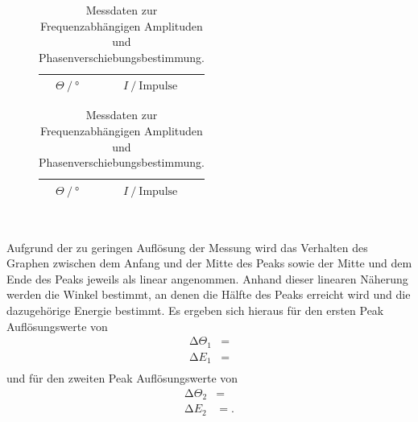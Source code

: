 \begin{table}
  \hspace*{\fill}
  \begin{subfigure}{0.40\textwidth}
  \centering
  \label{tab:2a}
  \begin{tabular}{c c}
    \toprule
     {$\Theta \:/\: \si{\degree}$} & {$I \:/\: \text{Impulse}$}\\
    \midrule
    
    \bottomrule
  \end{tabular}
\end{subfigure}
\hspace*{\fill}
\begin{subfigure}{0.40\textwidth}
  \centering
  \label{tab:2b}
  \begin{tabular}{c c}
    \toprule
     {$\Theta \:/\: \si{\degree}$} & {$I \:/\: \text{Impulse}$}\\
    \midrule
    
    \bottomrule
  \end{tabular}
\end{subfigure}
\\
\hspace*{\fill}
\hspace*{\fill}
\caption{Messdaten zur Frequenzabhängigen Amplituden und Phasenverschiebungsbestimmung.}
\label{tab:2}
\end{table}
Aufgrund der zu geringen Auflösung der Messung wird das Verhalten des Graphen zwischen dem Anfang und der Mitte des Peaks sowie der Mitte und dem Ende des Peaks jeweils als linear angenommen.
Anhand dieser linearen Näherung werden die Winkel bestimmt, an denen die Hälfte des Peaks erreicht wird und die dazugehörige Energie bestimmt.
Es ergeben sich hieraus für den ersten Peak Auflösungswerte von
\begin{align*}
  \increment \Theta_1 &=  \\
  \increment E_1 &=  \\
\end{align*}
und für den zweiten Peak Auflösungswerte von
\begin{align*}
  \increment \Theta_2 &=  \\
  \increment E_2 &= . \\
\end{align*}

